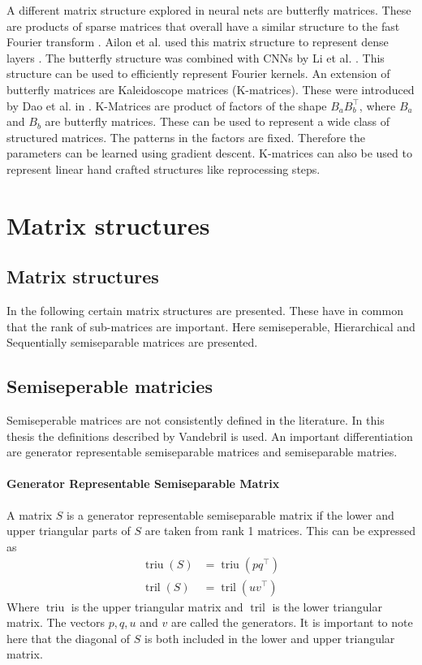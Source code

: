 \documentclass[doctype=mastersthesis,BCOR=15mm,biblatex]{ldvbook}%
\DeclareMathOperator{\triu}{triu}
\DeclareMathOperator{\tril}{tril}
\begin{document}
A different matrix structure explored in neural nets are butterfly matrices.
These are products of sparse matrices that overall have a similar structure to the fast Fourier transform \cite{li_butterfly_2015,parker_random_1995}. Ailon et al. used this matrix structure to represent dense layers \cite{ailon_sparse_2021}.
The butterfly structure was combined with CNNs by Li et al. \cite{li_butterfly-net_2020}. This structure can be used to efficiently represent Fourier kernels.
An extension of butterfly matrices are Kaleidoscope matrices (K-matrices). These were introduced by Dao et al. in \cite{dao_kaleidoscope_2020}.
K-Matrices are product of factors of the shape $B_aB_b^\top$, where $B_a$ and $B_b$ are butterfly matrices. These can be used to represent a wide class of structured matrices.
The patterns in the factors are fixed. Therefore the parameters can be learned using gradient descent.
K-matrices can also be used to represent linear hand crafted structures like reprocessing steps. %




\section{Matrix structures}

\subsection{Matrix structures}
In the following certain matrix structures are presented.
These have in common that the rank of sub-matrices are important.
Here semiseperable, Hierarchical and Sequentially semiseparable matrices are presented.

\subsection{Semiseperable matricies}
Semiseperable matrices are not consistently defined in the literature. 
In this thesis the definitions described by Vandebril \cite{vandebril_bibliography_2005,vandebril_matrix_2007} is used.
An important differentiation are generator representable semiseparable matrices and semiseparable matries.
\paragraph{Generator Representable Semiseparable Matrix}
A matrix $S$ is a generator representable semiseparable matrix if the lower and upper triangular parts of $S$ are taken from rank 1 matrices.
This can be expressed as 
\begin{align}
	\triu(S) &= \triu(pq^\top)\\
	\tril(S) &= \tril(uv^\top)
\end{align}
Where $\triu$ is the upper triangular matrix and $\tril$ is the lower triangular matrix. The vectors $p,q,u$ and $v$ are called the generators.
It is important to note here that the diagonal of $S$ is both included in the lower and upper triangular matrix.
\end{document}

